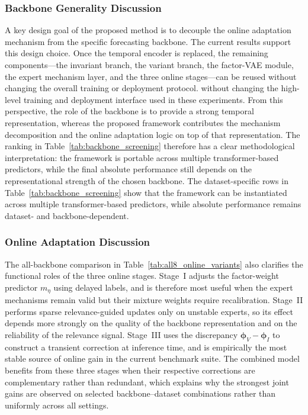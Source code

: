﻿\documentclass[journal]{IEEEtran}
\DeclareRobustCommand{\oldtext}[1]{{\color{revisionred}#1}}
\DeclareRobustCommand{\newtext}[1]{{\color{revisionblue}#1}}
\DeclareRobustCommand{\why}[1]{{\color{revisionblue}{\footnotesize (#1)}}}
\DeclareRobustCommand{\rw}[3]{\oldtext{#1} \newtext{#2}\why{#3}}
\begin{document}
\subsubsection{Backbone Generality Discussion}
A key design goal of the proposed method is to decouple the online adaptation mechanism from the specific forecasting backbone. The current results support this design choice. Once the temporal encoder is replaced, the remaining components---the invariant branch, the variant branch, the factor-VAE module, the expert mechanism layer, and the three online stages---can be reused \rw{without changing the overall training or deployment protocol.}{without changing the high-level training and deployment interface used in these experiments.}{避免承诺真实部署协议完全不变。} From this perspective, the role of the backbone is to provide a strong temporal representation, whereas the proposed framework contributes the mechanism decomposition and the online adaptation logic on top of that representation. \rw{The ranking in Table~\ref{tab:backbone_screening} therefore has a clear methodological interpretation: the framework is portable across multiple transformer-based predictors, while the final absolute performance still depends on the representational strength of the chosen backbone.}{The dataset-specific rows in Table~\ref{tab:backbone_screening} show that the framework can be instantiated across multiple transformer-based predictors, while absolute performance remains dataset- and backbone-dependent.}{Table III 已合并为一个逐数据集长表，讨论文字同步改为 dataset-specific rows。}

\subsubsection{Online Adaptation Discussion}
The all-backbone comparison in Table~\ref{tab:all8_online_variants} also clarifies the functional roles of the three online stages. Stage~I adjusts the factor-weight predictor $m_{\eta}$ using delayed labels, and is therefore most useful when the expert mechanisms remain valid but their mixture weights require recalibration. Stage~II performs sparse relevance-guided updates only on unstable experts, so its effect depends more strongly on the quality of the backbone representation and on the reliability of the relevance signal. Stage~III uses the discrepancy $\boldsymbol{\phi}_V-\boldsymbol{\phi}_I$ to construct a transient correction at inference time, and is empirically the most stable source of online gain in the current benchmark suite. The combined model benefits from these three stages when their respective corrections are complementary rather than redundant, which explains why the strongest joint gains are observed on selected backbone--dataset combinations rather than uniformly across all settings.
\end{document}
